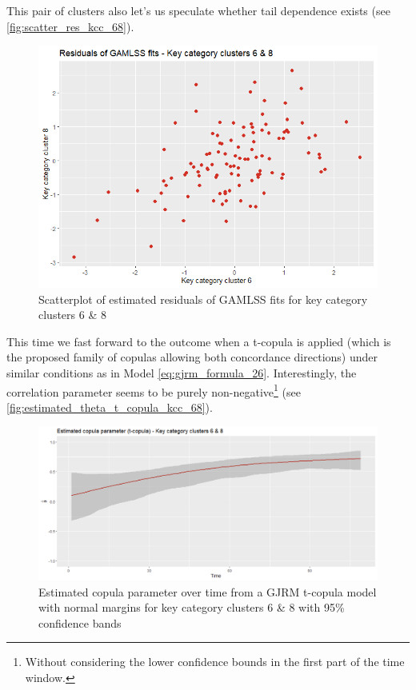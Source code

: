 This pair of clusters also let's us speculate whether tail dependence exists (see \autoref{fig:scatter_res_kcc_68}).
\\


\begin{figure}[H]
\centering
  \includegraphics[width=0.45\linewidth]{figures/scatter_res_kcc_68.png}
  \caption{Scatterplot of estimated residuals of GAMLSS fits for key category clusters 6 \& 8}
  \label{fig:scatter_res_kcc_68}
\end{figure}


This time we fast forward to the outcome when a t-copula is applied (which is the proposed family of copulas allowing both concordance directions) under similar conditions as in Model \ref{eq:gjrm_formula_26}. Interestingly, the correlation parameter seems to be purely non-negative\footnote{Without considering the lower confidence bounds in the first part of the time window.} (see \autoref{fig:estimated_theta_t_copula_kcc_68}).
\\


\begin{figure}[H]
\centering
  \includegraphics[width=0.95\linewidth]{figures/estimated_theta_t_copula_kcc_68.png}
  \caption{Estimated copula parameter over time from a \ac{GJRM} t-copula model with normal margins for key category clusters 6 \& 8 with 95\% confidence bands}
  \label{fig:estimated_theta_t_copula_kcc_68}
\end{figure}


